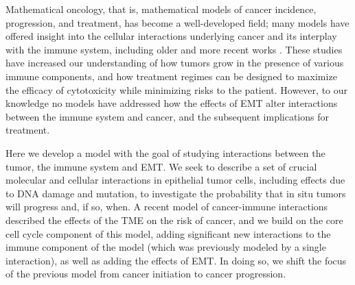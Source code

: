 \documentclass[11pt]{article}
\begin{document}
\par
\par
Mathematical oncology, that is, mathematical models of cancer incidence, progression, and treatment, has become a well-developed field; many models have offered insight into the cellular interactions underlying cancer and its interplay with the immune system, including older \cite{anderson98_continuous, sherrattjonathana.92_oncogenes, pillis05_validated} and more recent works \cite{kim18_cell, gallaher14_bridging, gallaher18_spatial, an15_agentbased, serre16_mathematical, louzoun14_mathematical, briones-orta13_arkadia, lavi13_role, greene15_modeling, greene16_mathematical, cho17_modeling-1,  benzekry17_mathematical, owen11_mathematical, west18_multidrug}. These studies have increased our understanding of how tumors grow in the presence of various immune components, and how treatment regimes can be designed to maximize the efficacy of cytotoxicity while minimizing risks to the patient. However, to our knowledge no models have addressed how the effects of EMT alter interactions between the immune system and cancer, and the subsequent implications for treatment. 
\par
Here we develop a model with the goal of studying interactions between the tumor, the immune system and EMT.
We seek to describe a set of crucial molecular and cellular interactions in epithelial tumor cells, including effects due to DNA damage and mutation, to investigate the probability that in situ tumors will progress and, if so, when.
A recent model of cancer-immune interactions \cite{guo17_multiscale} described the effects of the TME on the risk of cancer, and we build on the core cell cycle component of this model, adding significant new interactions to the immune component of the model (which was previously modeled by a single interaction), as well as adding the effects of EMT.
In doing so, we shift the focus of the previous model from cancer initiation to cancer progression.
\end{document}
